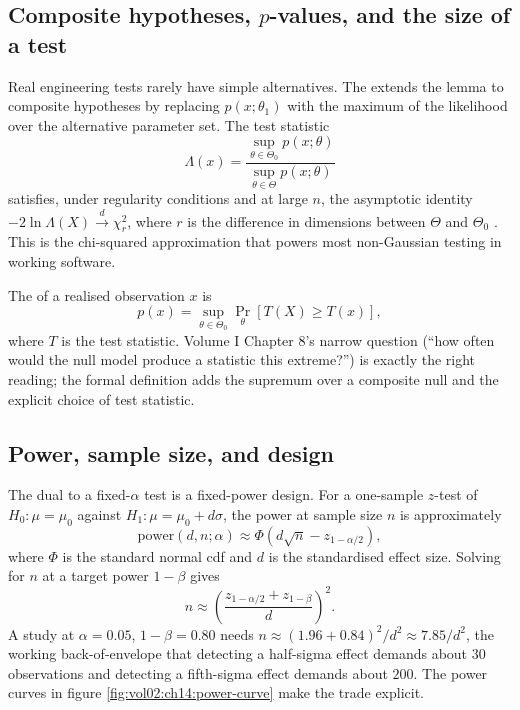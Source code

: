 \subsection{Composite hypotheses, $p$-values, and the size of a test}

Real engineering tests rarely have simple alternatives. The
 extends the lemma to
composite hypotheses by replacing $p(x; \theta_{1})$ with the
maximum of the likelihood over the alternative parameter set. The
test statistic
\[
\Lambda(x) = \frac{\sup_{\theta \in \Theta_{0}} p(x; \theta)}
                  {\sup_{\theta \in \Theta} p(x; \theta)}
\]
satisfies, under regularity conditions and at large $n$, the
asymptotic identity $-2\ln\Lambda(X) \xrightarrow{d}
\chi^{2}_{r}$, where $r$ is the difference in dimensions between
$\Theta$ and $\Theta_{0}$ \cite[ch.~10]{text:wasserman2004}. This
is the chi-squared approximation that powers most non-Gaussian
testing in working software.

The  of a realised observation $x$ is
\[
p(x) = \sup_{\theta \in \Theta_{0}} \Pr_{\theta}[T(X) \geq T(x)],
\]
where $T$ is the test statistic. Volume I Chapter 8's narrow
question (``how often would the null model produce a statistic this
extreme?'') is exactly the right reading; the formal definition
adds the supremum over a composite null and the explicit choice of
test statistic.



\subsection{Power, sample size, and design}

The dual to a fixed-$\alpha$ test is a fixed-power design. For a
one-sample $z$-test of $H_{0}: \mu = \mu_{0}$ against $H_{1}: \mu =
\mu_{0} + d\sigma$, the power at sample size $n$ is approximately
\[
\mathrm{power}(d, n; \alpha) \approx
\Phi\!\left(d\sqrt{n} - z_{1-\alpha/2}\right),
\]
where $\Phi$ is the standard normal cdf and $d$ is the
standardised effect size. Solving for $n$ at a target power
$1-\beta$ gives
\[
n \approx \left(\frac{z_{1-\alpha/2} + z_{1-\beta}}{d}\right)^{2}.
\]
A study at $\alpha = 0.05$, $1-\beta = 0.80$ needs
$n \approx (1.96 + 0.84)^{2}/d^{2} \approx 7.85/d^{2}$, the
working back-of-envelope that detecting a half-sigma effect
demands about $30$ observations and detecting a fifth-sigma effect
demands about $200$. The power curves in figure
\ref{fig:vol02:ch14:power-curve} make the trade explicit.

